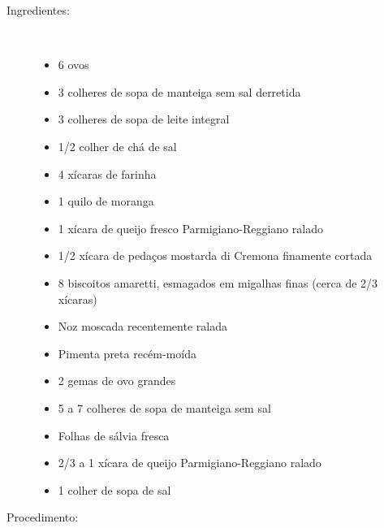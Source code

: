 \documentclass [11pt, letterpaper] {article}
\begin{document}
\begin {description}

\item [Ingredientes:] \ \\
\begin {itemize}
\item 6 ovos
\item 3 colheres de sopa de manteiga sem sal derretida
\item 3 colheres de sopa de leite integral
\item 1/2 colher de chá de sal
\item 4 xícaras de farinha
\item 1 quilo de moranga
\item 1 xícara de queijo fresco Parmigiano-Reggiano ralado
\item 1/2 xícara  de pedaços mostarda di Cremona finamente cortada
\item 8 biscoitos amaretti, esmagados em migalhas finas (cerca de 2/3 xícaras)
\item Noz moscada recentemente ralada
\item Pimenta preta recém-moída
\item 2 gemas de ovo grandes
\item 5 a 7 colheres de sopa de manteiga sem sal
\item Folhas de sálvia fresca
\item 2/3 a 1 xícara de queijo Parmigiano-Reggiano ralado
\item 1 colher de sopa de sal
\end {itemize}


\item [Procedimento:] \ \\


\end{description}
\end{document}

